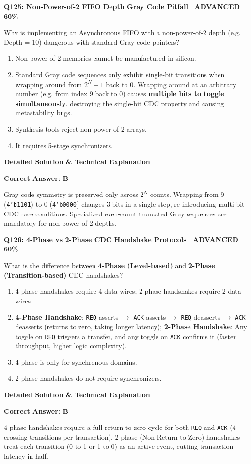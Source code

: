 \documentclass[11pt,a4paper]{article}
\newcommand{\badgeadv}{{\color{white}\colorbox{advred}{\bfseries\sffamily\tiny\ ADVANCED 60\%\ }}}
\newenvironment{qbox}[2]{%
  \begin{mdframed}[style=qstyle]%
  {\bfseries\sffamily\color{primaryblue}#1 \hfill #2}\par\vspace{2pt}%
}{%
  \end{mdframed}%
}
\newenvironment{ansbox}{%
  \begin{mdframed}[style=ansstyle]%
  {\bfseries\sffamily\color{ansgreen}\small Detailed Solution \& Technical Explanation}\par\vspace{2pt}\small%
}{%
  \end{mdframed}%
}
\begin{document}
\begin{qbox}{Q125: Non-Power-of-2 FIFO Depth Gray Code Pitfall}{\badgeadv}
Why is implementing an Asynchronous FIFO with a non-power-of-2 depth (e.g. Depth = 10) dangerous with standard Gray code pointers?
\begin{enumerate}[label=\textbf{\Alph*.}]
  \item Non-power-of-2 memories cannot be manufactured in silicon.
  \item Standard Gray code sequences only exhibit single-bit transitions when wrapping around from $2^N - 1$ back to $0$. Wrapping around at an arbitrary number (e.g. from index 9 back to 0) causes \textbf{multiple bits to toggle simultaneously}, destroying the single-bit CDC property and causing metastability bugs.
  \item Synthesis tools reject non-power-of-2 arrays.
  \item It requires 5-stage synchronizers.
\end{enumerate}
\end{qbox}
\begin{ansbox}
\textbf{Correct Answer: B}

Gray code symmetry is preserved only across $2^N$ counts. Wrapping from $9$ (\texttt{4'b1101}) to $0$ (\texttt{4'b0000}) changes 3 bits in a single step, re-introducing multi-bit CDC race conditions. Specialized even-count truncated Gray sequences are mandatory for non-power-of-2 depths.
\end{ansbox}

\begin{qbox}{Q126: 4-Phase vs 2-Phase CDC Handshake Protocols}{\badgeadv}
What is the difference between \textbf{4-Phase (Level-based)} and \textbf{2-Phase (Transition-based)} CDC handshakes?
\begin{enumerate}[label=\textbf{\Alph*.}]
  \item 4-phase handshakes require 4 data wires; 2-phase handshakes require 2 data wires.
  \item \textbf{4-Phase Handshake}: \texttt{REQ} asserts $\rightarrow$ \texttt{ACK} asserts $\rightarrow$ \texttt{REQ} deasserts $\rightarrow$ \texttt{ACK} deasserts (returns to zero, taking longer latency); \textbf{2-Phase Handshake}: Any toggle on \texttt{REQ} triggers a transfer, and any toggle on \texttt{ACK} confirms it (faster throughput, higher logic complexity).
  \item 4-phase is only for synchronous domains.
  \item 2-phase handshakes do not require synchronizers.
\end{enumerate}
\end{qbox}
\begin{ansbox}
\textbf{Correct Answer: B}

4-phase handshakes require a full return-to-zero cycle for both \texttt{REQ} and \texttt{ACK} (4 crossing transitions per transaction). 2-phase (Non-Return-to-Zero) handshakes treat each transition (0-to-1 or 1-to-0) as an active event, cutting transaction latency in half.
\end{ansbox}
\end{document}

